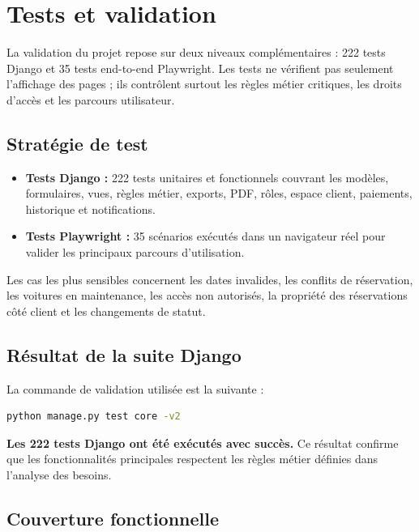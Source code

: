 \chapter{Tests et validation}

La validation du projet repose sur deux niveaux complémentaires : 222 tests Django et 35 tests end-to-end Playwright. Les tests ne vérifient pas seulement l'affichage des pages ; ils contrôlent surtout les règles métier critiques, les droits d'accès et les parcours utilisateur.

\section{Stratégie de test}

\begin{itemize}
  \item \textbf{Tests Django :} 222 tests unitaires et fonctionnels couvrant les modèles, formulaires, vues, règles métier, exports, PDF, rôles, espace client, paiements, historique et notifications.
  \item \textbf{Tests Playwright \cite{playwright} :} 35 scénarios exécutés dans un navigateur réel pour valider les principaux parcours d'utilisation.
\end{itemize}

Les cas les plus sensibles concernent les dates invalides, les conflits de réservation, les voitures en maintenance, les accès non autorisés, la propriété des réservations côté client et les changements de statut.

\section{Résultat de la suite Django}

La commande de validation utilisée est la suivante :

\begin{lstlisting}[language=bash]
python manage.py test core -v2
\end{lstlisting}

\textbf{Les 222 tests Django ont été exécutés avec succès.} Ce résultat confirme que les fonctionnalités principales respectent les règles métier définies dans l'analyse des besoins.

\section{Couverture fonctionnelle}

